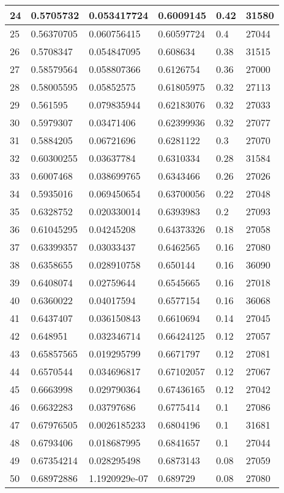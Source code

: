 \begin{longtable}{|l|l|l|l|l|l|}
24 & 0.5705732 & 0.053417724 & 0.6009145 & 0.42 & 31580 \\ \hline 
25 & 0.56370705 & 0.060756415 & 0.60597724 & 0.4 & 27044 \\ \hline 
26 & 0.5708347 & 0.054847095 & 0.608634 & 0.38 & 31515 \\ \hline 
27 & 0.58579564 & 0.058807366 & 0.6126754 & 0.36 & 27000 \\ \hline 
28 & 0.58005595 & 0.05852575 & 0.61805975 & 0.32 & 27113 \\ \hline 
29 & 0.561595 & 0.079835944 & 0.62183076 & 0.32 & 27033 \\ \hline 
30 & 0.5979307 & 0.03471406 & 0.62399936 & 0.32 & 27077 \\ \hline 
31 & 0.5884205 & 0.06721696 & 0.6281122 & 0.3 & 27070 \\ \hline 
32 & 0.60300255 & 0.03637784 & 0.6310334 & 0.28 & 31584 \\ \hline 
33 & 0.6007468 & 0.038699765 & 0.6343466 & 0.26 & 27026 \\ \hline 
34 & 0.5935016 & 0.069450654 & 0.63700056 & 0.22 & 27048 \\ \hline 
35 & 0.6328752 & 0.020330014 & 0.6393983 & 0.2 & 27093 \\ \hline 
36 & 0.61045295 & 0.04245208 & 0.64373326 & 0.18 & 27058 \\ \hline 
37 & 0.63399357 & 0.03033437 & 0.6462565 & 0.16 & 27080 \\ \hline 
38 & 0.6358655 & 0.028910758 & 0.650144 & 0.16 & 36090 \\ \hline 
39 & 0.6408074 & 0.02759644 & 0.6545665 & 0.16 & 27018 \\ \hline 
40 & 0.6360022 & 0.04017594 & 0.6577154 & 0.16 & 36068 \\ \hline 
41 & 0.6437407 & 0.036150843 & 0.6610694 & 0.14 & 27045 \\ \hline 
42 & 0.648951 & 0.032346714 & 0.66424125 & 0.12 & 27057 \\ \hline 
43 & 0.65857565 & 0.019295799 & 0.6671797 & 0.12 & 27081 \\ \hline 
44 & 0.6570544 & 0.034696817 & 0.67102057 & 0.12 & 27067 \\ \hline 
45 & 0.6663998 & 0.029790364 & 0.67436165 & 0.12 & 27042 \\ \hline 
46 & 0.6632283 & 0.03797686 & 0.6775414 & 0.1 & 27086 \\ \hline 
47 & 0.67976505 & 0.0026185233 & 0.6804196 & 0.1 & 31681 \\ \hline 
48 & 0.6793406 & 0.018687995 & 0.6841657 & 0.1 & 27044 \\ \hline 
49 & 0.67354214 & 0.028295498 & 0.6873143 & 0.08 & 27059 \\ \hline 
50 & 0.68972886 & 1.1920929e-07 & 0.689729 & 0.08 & 27080 \\ \hline 
\end{longtable}